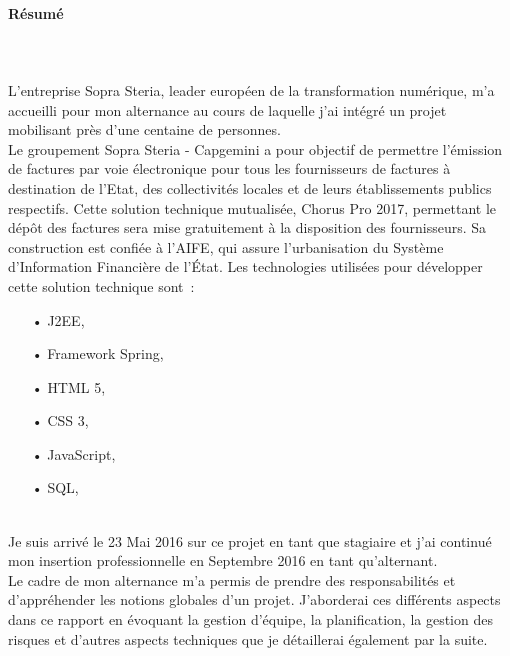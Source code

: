 \documentclass[12pt,a4paper]{article}
\begin{document}
\paragraph{Résumé}
~~\\\\
L'entreprise Sopra Steria, leader européen de la transformation numérique, m'a accueilli pour mon alternance au cours de laquelle j'ai intégré un projet mobilisant près d'une centaine de personnes.\\
Le groupement Sopra Steria - Capgemini a pour objectif de permettre l’émission de factures par voie électronique pour tous les fournisseurs de factures à destination de l’Etat, des collectivités locales et de leurs établissements publics respectifs.
Cette solution technique mutualisée, Chorus Pro 2017, permettant le dépôt des factures sera mise gratuitement à la disposition des fournisseurs. Sa construction est confiée à l'\gls{AIFE}, qui assure l’urbanisation du Système d’Information Financière de l’État.
Les technologies utilisées pour développer cette solution technique sont~:\\
\begin{itemize}
\item[•] \gls{J2EE},
\item[•] Framework Spring,
\item[•] \gls{HTML} 5,
\item[•] \gls{CSS} 3,
\item[•] JavaScript,
\item[•] \gls{SQL},
\end{itemize}
~~\\
Je suis arrivé le 23 Mai 2016 sur ce projet en tant que stagiaire et j'ai continué mon insertion professionnelle en Septembre 2016 en tant qu'alternant.\\
Le cadre de mon alternance m’a permis de prendre des responsabilités et d’appréhender les notions globales d’un projet. J'aborderai ces différents aspects dans ce rapport en évoquant la gestion d’équipe, la planification, la gestion des risques et d’autres aspects techniques que je détaillerai également par la suite.\\
\newpage
\end{document}
